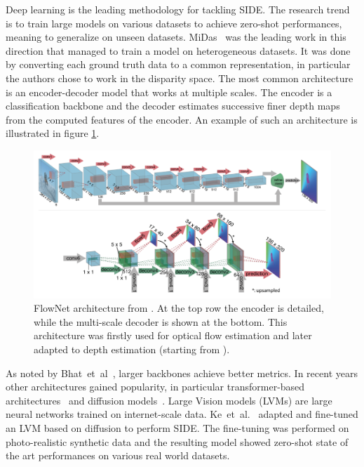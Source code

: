 Deep learning is the leading methodology for tackling SIDE.
The research trend is to train large models on various datasets to achieve zero-shot performances, meaning to generalize on unseen datasets.
MiDas~\cite{MiDas} was the leading work in this direction that managed to train a model on heterogeneous datasets.
It was done by converting each ground truth data to a common representation, in particular the authors chose to work in the disparity space.
The most common architecture is an encoder-decoder model that works at multiple scales.
The encoder is a classification backbone and the decoder estimates successive finer depth maps from the computed features of the encoder.
An example of such an architecture is illustrated in figure \ref{fig:flow_net}.
\begin{figure}
    \includegraphics[scale=0.5]{figs/flow_net}
    \caption{
        FlowNet architecture from \cite{FlowNet}.
        At the top row the encoder is detailed, while the multi-scale decoder is shown at the bottom.
        This architecture was firstly used for optical flow estimation and later adapted to depth estimation (starting from \cite{DispNet}).
        \label{fig:flow_net}    
    }
\end{figure}
As noted by Bhat~et~al~\cite{ZoeDepth}, larger backbones achieve better metrics.
In recent years other architectures gained popularity, in particular transformer-based architectures~\cite{denseViT, PatchFusion} and diffusion models~\cite{Marigold}.
Large Vision models (LVMs) are large neural networks trained on internet-scale data.
Ke~et~al.~\cite{Marigold} adapted and fine-tuned an LVM based on diffusion to perform SIDE.
The fine-tuning was performed on photo-realistic synthetic data and the resulting model showed zero-shot state of the art performances on various real world datasets.

